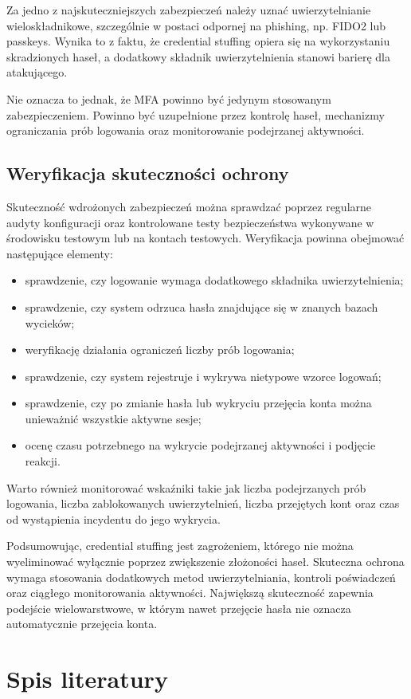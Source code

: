 \documentclass[12pt,a4paper]{article}
\begin{document}
Za jedno z najskuteczniejszych zabezpieczeń należy uznać uwierzytelnianie wieloskładnikowe, szczególnie w postaci odpornej na phishing, np. FIDO2 lub passkeys. Wynika to z faktu, że credential stuffing opiera się na wykorzystaniu skradzionych haseł, a dodatkowy składnik uwierzytelnienia stanowi barierę dla atakującego.

Nie oznacza to jednak, że MFA powinno być jedynym stosowanym zabezpieczeniem. Powinno być uzupełnione przez kontrolę haseł, mechanizmy ograniczania prób logowania oraz monitorowanie podejrzanej aktywności.

\subsection{Weryfikacja skuteczności ochrony}

Skuteczność wdrożonych zabezpieczeń można sprawdzać poprzez regularne audyty konfiguracji oraz kontrolowane testy bezpieczeństwa wykonywane w środowisku testowym lub na kontach testowych. Weryfikacja powinna obejmować następujące elementy:

\begin{itemize}
    \item sprawdzenie, czy logowanie wymaga dodatkowego składnika uwierzytelnienia;
    \item sprawdzenie, czy system odrzuca hasła znajdujące się w znanych bazach wycieków;
    \item weryfikację działania ograniczeń liczby prób logowania;
    \item sprawdzenie, czy system rejestruje i wykrywa nietypowe wzorce logowań;
    \item sprawdzenie, czy po zmianie hasła lub wykryciu przejęcia konta można unieważnić wszystkie aktywne sesje;
    \item ocenę czasu potrzebnego na wykrycie podejrzanej aktywności i podjęcie reakcji.
\end{itemize}

Warto również monitorować wskaźniki takie jak liczba podejrzanych prób logowania, liczba zablokowanych uwierzytelnień, liczba przejętych kont oraz czas od wystąpienia incydentu do jego wykrycia.

Podsumowując, credential stuffing jest zagrożeniem, którego nie można wyeliminować wyłącznie poprzez zwiększenie złożoności haseł. Skuteczna ochrona wymaga stosowania dodatkowych metod uwierzytelniania, kontroli poświadczeń oraz ciągłego monitorowania aktywności. Największą skuteczność zapewnia podejście wielowarstwowe, w którym nawet przejęcie hasła nie oznacza automatycznie przejęcia konta.

\newpage
\section{Spis literatury}

\printbibliography[heading=none]
\end{document}
